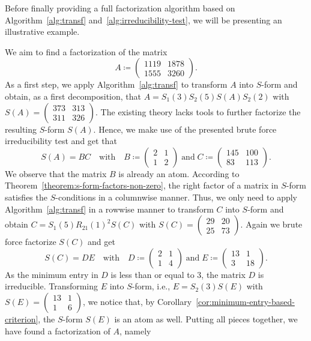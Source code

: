 Before finally providing a full factorization algorithm based on Algorithm~\ref{alg:transf} and~\ref{alg:irreducibility-test}, we will be presenting an illustrative example.

\begin{example}
We aim to find a factorization of the matrix
\[ A \coloneqq \begin{pmatrix} 1119 & 1878 \\ 1555  & 3260\end{pmatrix}. \]
As a first step, we apply Algorithm~\ref{alg:transf} to transform $A$ into $S$-form and obtain, as a first decomposition, that $A = S_1(3)S_2(5)S(A)S_2(2)$ with $S(A) = \begin{pmatrix} 373 & 313 \\ 311 & 326 \end{pmatrix}$. The existing theory lacks tools to further factorize the resulting $S$-form $S(A)$. Hence, we make use of the presented brute force irreducibility test and get that
\[ S(A) = BC \quad \text{with} \quad B \coloneqq \begin{pmatrix} 2 & 1 \\ 1 & 2 \end{pmatrix}\;\text{and}\;C \coloneqq \begin{pmatrix} 145 & 100 \\ 83 & 113 \end{pmatrix}. \]
We observe that the matrix $B$ is already an atom. According to Theorem~\ref{theorem:s-form-factors-non-zero}, the right factor of a matrix in $S$-form satisfies the $S$-conditions in a columnwise manner. Thus, we only need to apply Algorithm~\ref{alg:transf} in a rowwise manner to transform $C$ into $S$-form and obtain $C = S_1(5)R_{21}(1)^2S(C)$ with $S(C) = \begin{pmatrix} 29 & 20 \\ 25 & 73 \end{pmatrix}$. Again we brute force factorize $S(C)$ and get 
\[ S(C) = DE \quad \text{with} \quad D \coloneqq \begin{pmatrix} 2 & 1 \\ 1 & 4 \end{pmatrix}\;\text{and}\;E \coloneqq \begin{pmatrix} 13 & 1 \\ 3 & 18 \end{pmatrix}.  \]
As the minimum entry in $D$ is less than or equal to $3$, the matrix $D$ is irreducible. Transforming $E$ into $S$-form, i.e., $E = S_2(3)S(E)$ with $S(E) = \begin{pmatrix} 13 & 1 \\ 1 & 6 \end{pmatrix}$, we notice that, by Corollary~\ref{cor:minimum-entry-based-criterion}, the $S$-form $S(E)$ is an atom as well. Putting all pieces together, we have found a factorization of $A$, namely

\end{example}
